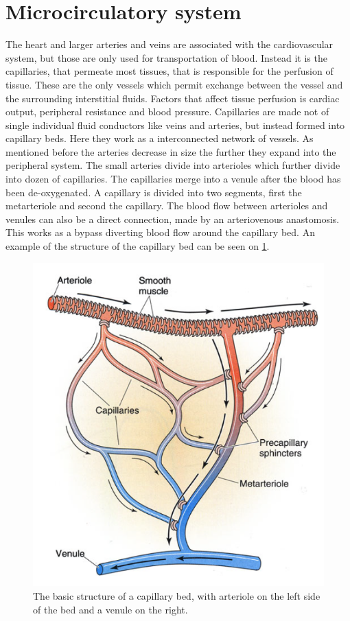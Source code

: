 
\section{Microcirculatory system}

The heart and larger arteries and veins are associated with the cardiovascular system, but those are only used for transportation of blood. Instead it is the capillaries, that permeate most tissues, that is responsible for the perfusion of tissue. These are the only vessels which permit exchange between the vessel and the surrounding interstitial fluids.  Factors that affect tissue perfusion is cardiac output, peripheral resistance and blood pressure. Capillaries are made not of single individual fluid conductors like veins and arteries, but instead formed into capillary beds. Here they work as a interconnected network of vessels.
As mentioned before the arteries decrease in size the further they expand into the peripheral system. The small arteries divide into arterioles which further divide into dozen of capillaries. The capillaries merge into a venule after the blood has been de-oxygenated. A capillary is divided into two segments, first the metarteriole and second the capillary. The blood flow between arterioles and venules can also be a direct connection, made by an arteriovenous anastomosis. This works as a bypass diverting blood flow around the capillary bed. An example of the structure of the capillary bed can be seen on \cref{fig:beds}.\cite{martini2012}
\begin{figure}[H]                                         
	\includegraphics[width=.6\textwidth]{figures/capillary_bed}  
	\caption{The basic structure of a capillary bed, with arteriole on the left side of the bed and a venule on the right\cite{martini2012}.}
	\label{fig:beds}  
\end{figure}          

